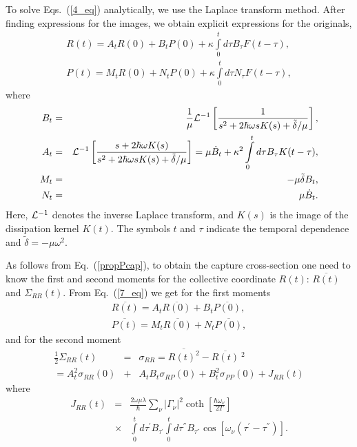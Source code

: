 \documentclass[preprint,review,12pt]{elsarticle}
\begin{document}
  To solve Eqs.~(\ref{4_eq}) analytically, we use the Laplace transform method. After finding expressions for the
  images, we obtain explicit expressions for the originals,
  \begin{eqnarray}
  R(t)=A_t R(0)+B_t P(0)+\kappa\int\limits_{0}^{t}d\tau B_\tau F(t-\tau),\nonumber\\
  P(t)=M_t R(0)+N_t P(0)+\kappa\int\limits_{0}^{t}d\tau N_\tau F(t-\tau),
  \label{7_eq}
  \end{eqnarray}
  where
  \begin{eqnarray}
  B_t&=&\frac{1}{\mu} {\cal L}^{-1}\left[\frac{1}{s^2+2\hbar\omega sK(s)+\tilde\delta/\mu}\right],\nonumber\\
  A_t&=&{\cal L}^{-1} \left[\frac{s+2\hbar\omega K(s)}{s^2+2\hbar\omega sK(s)+\tilde\delta/\mu}\right]=
  \mu\dot B_t + \kappa^2\int\limits_{0}^{t}d\tau B_\tau K(t-\tau),\nonumber\\
  M_t&=&-\mu{\tilde \delta} B_t,\nonumber\\
  N_t&=&\mu\dot B_t.
  \label{ABfun}
  \end{eqnarray}
  Here, ${\cal L}^{-1}$ denotes the inverse Laplace transform, and $K(s)$ is the image of the dissipation kernel $K(t)$.
  The symbols $t$ and $\tau$ indicate the temporal dependence and $\tilde{\delta}=-\mu\omega^2$.

  As follows from Eq.~(\ref{propPcap}), to obtain the capture cross-section one need to know the first and second moments for the collective coordinate $R(t)$:
  $\overline{R(t)}$ and $\Sigma_{RR}(t)$.
  From Eq.~(\ref{7_eq}) we get for the first moments
  \begin{eqnarray}
  \overline{R(t)}=A_t\overline{R(0)} + B_t \overline{P(0)}, \nonumber\\
  \overline{P(t)}=M_t \overline{R(0)} + N_t \overline{P(0)},
  \label{8_eq}
  \end{eqnarray}
  and for the second moment
  \begin{eqnarray}
  \frac{1}{2}\Sigma_{RR}(t)&=&\sigma_{RR}=\overline{R(t)^2}-\overline{R(t)}\ ^2\nonumber\\
  =A_t^2\sigma_{RR}(0)&+&A_t B_t\sigma_{RP}(0)+B_t^2\sigma_{PP}(0)+J_{RR}(t)
  \end{eqnarray}
  where
  \begin{eqnarray}
  J_{RR}(t)&=&\frac{2\omega\mu\lambda}{\hbar}
  \sum_{\nu}^{}|\Gamma_\nu|^2\coth\left[\frac{\hbar\omega_\nu}{2T}\right]  \nonumber\\
&\times& \int\limits_{0}^{t}
  d\tau^{'}B_{\tau^{'}}  \int\limits_{0}^{t} d\tau^{''}B_{\tau^{''}}
  \cos[\omega_\nu (\tau^{'}-\tau^{''})].
  \label{Jrr}
  \end{eqnarray}
\end{document}
